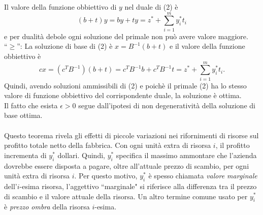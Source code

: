 \documentclass[a4paper,11pt]{article}
\begin{document}
	Il valore della funzione obbiettivo di $y$ nel duale di (2) è $$(b+t)y=by+ty=z^*+\sum_{i=1}^{m}y^*_it_i $$ e per dualità debole ogni soluzione del primale non può avere valore maggiore.\\
	\textquotedblleft$\geq$\textquotedblright: La soluzione di base di (2) è $x=B^{-1}(b+t)$ e il valore della funzione obbiettivo è $$cx=(c^TB^{-1})(b+t)=c^TB^{-1}b+c^TB^{-1}t=z^*+\sum_{i=1}^{m}y^*_it_i .$$ Quindi, avendo soluzioni ammissibili di (2) e poichè il primale (2) ha lo stesso valore di funzione obbiettivo del corrispondente duale, la soluzione è ottima.
	\\
	Il fatto che esista $\epsilon>0$ segue dall'ipotesi di non degeneratività della soluzione di base ottima. \Square \\
\\ Questo teorema rivela gli effetti di piccole variazioni nei rifornimenti di risorse sul profitto totale netto della fabbrica. Con ogni unità extra di risorsa $i$, il profitto incrementa di $y^*_i$ dollari. 
	Quindi, $y^*_i$ specifica il massimo ammontare che l'azienda dovrebbe essere disposta a pagare, oltre all'attuale prezzo di scambio, per ogni unità extra di risorsa $i$. Per questo motivo, $y^*_i$ è spesso chiamata \textit{valore marginale} dell'$i$-esima risorsa, l'aggettivo \textquotedblleft marginale" si riferisce alla differenza tra il prezzo di scambio e il valore attuale della risorsa. Un altro termine comune usato per $y^*_i$ è \textit{prezzo ombra} della risorsa $i$-esima.\\
	
\end{document}
